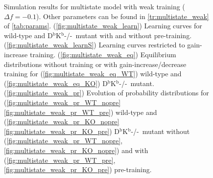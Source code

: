 \documentclass[12pt]{article}
\newcommand{\KO}{D$^\mathrm{b}$K$^\mathrm{b}$-/-}
\begin{document}
\begin{figure}
 \begin{center}
 \begin{myenuma}
  \item{}\label{fig:multistate_weak_learn}
  \item{}\label{fig:multistate_weak_learnS}
  \item\label{fig:multistate_weak_eq}\begin{myenumi}
                    \item{}\label{fig:multistate_weak_eq_WT}
                    \item{}\label{fig:multistate_weak_eq_KO}
                  \end{myenumi}
  \item\label{fig:multistate_weak_pr}\begin{myenumi}
                    \item{}\label{fig:multistate_weak_pr_WT_nopre}
                    \item{}\label{fig:multistate_weak_pr_WT_pre}
                    \item{}\label{fig:multistate_weak_pr_KO_nopre}
                    \item{}\label{fig:multistate_weak_pr_KO_pre}
                  \end{myenumi}
 \end{myenuma}
 \end{center}
  \caption{Simulation results for multistate model with weak training ($\Delta f=-0.1$).
  Other parameters can be found in \autoref{tr:multistate_weak} of \autoref{tab:params}.
  (\ref{fig:multistate_weak_learn}) Learning curves for wild-type and \KO\ mutant with and without pre-training.
  (\ref{fig:multistate_weak_learnS}) Learning curves restricted to gain-increase training.
  (\ref{fig:multistate_weak_eq}) Equilibrium distributions without training or with gain-increase/decrease training for (\ref{fig:multistate_weak_eq_WT}) wild-type and (\ref{fig:multistate_weak_eq_KO}) \KO\ mutant.
  (\ref{fig:multistate_weak_pr}) Evolution of probability distributions for (\ref{fig:multistate_weak_pr_WT_nopre}\ref{fig:multistate_weak_pr_WT_pre}) wild-type and  (\ref{fig:multistate_weak_pr_KO_nopre}\ref{fig:multistate_weak_pr_KO_pre}) \KO\ mutant without (\ref{fig:multistate_weak_pr_WT_nopre},\ref{fig:multistate_weak_pr_KO_nopre}) and with (\ref{fig:multistate_weak_pr_WT_pre},\ref{fig:multistate_weak_pr_KO_pre}) pre-training. } \label{fig:multistate_weak}
\end{figure}
\end{document}
